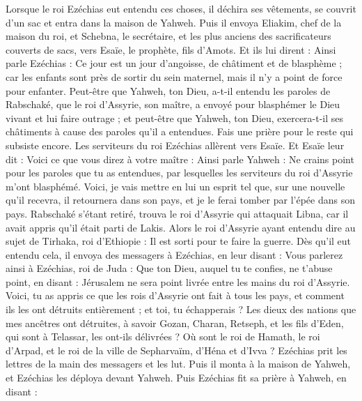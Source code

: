 \begin{multicols}{2}
\VerseOne{}Lorsque le roi Ezéchias eut entendu ces choses, il déchira ses vêtements, se couvrit d'un sac et entra dans la maison de Yahweh.
Puis il envoya Eliakim, chef de la maison du roi, et Schebna, le secrétaire, et les plus anciens des sacrificateurs couverts de sacs, vers Esaïe, le prophète, fils d'Amots.
Et ils lui dirent : Ainsi parle Ezéchias : Ce jour est un jour d'angoisse, de châtiment et de blasphème ; car les enfants sont près de sortir du sein maternel, mais il n'y a point de force pour enfanter.
Peut-être que Yahweh, ton Dieu, a-t-il entendu les paroles de Rabschaké, que le roi d'Assyrie, son maître, a envoyé pour blasphémer le Dieu vivant et lui faire outrage ; et peut-être que Yahweh, ton Dieu, exercera-t-il ses châtiments à cause des paroles qu'il a entendues. Fais une prière pour le reste qui subsiste encore.
Les serviteurs du roi Ezéchias allèrent vers Esaïe.
Et Esaïe leur dit : Voici ce que vous direz à votre maître : Ainsi parle Yahweh : Ne crains point pour les paroles que tu as entendues, par lesquelles les serviteurs du roi d'Assyrie m'ont blasphémé.
Voici, je vais mettre en lui un esprit tel que, sur une nouvelle qu'il recevra, il retournera dans son pays, et je le ferai tomber par l'épée dans son pays.
Rabschaké s'étant retiré, trouva le roi d'Assyrie qui attaquait Libna, car il avait appris qu'il était parti de Lakis.
Alors le roi d'Assyrie ayant entendu dire au sujet de Tirhaka, roi d'Ethiopie : Il est sorti pour te faire la guerre. Dès qu'il eut entendu cela, il envoya des messagers à Ezéchias, en leur disant :
Vous parlerez ainsi à Ezéchias, roi de Juda : Que ton Dieu, auquel tu te confies, ne t'abuse point, en disant : Jérusalem ne sera point livrée entre les mains du roi d'Assyrie.
Voici, tu as appris ce que les rois d'Assyrie ont fait à tous les pays, et comment ils les ont détruits entièrement ; et toi, tu échapperais ?
Les dieux des nations que mes ancêtres ont détruites, à savoir Gozan, Charan, Retseph, et les fils d'Eden, qui sont à Telassar, les ont-ils délivrées ?
Où sont le roi de Hamath, le roi d'Arpad, et le roi de la ville de Sepharvaïm, d'Héna et d'Ivva ?
Ezéchias prit les lettres de la main des messagers et les lut. Puis il monta à la maison de Yahweh, et Ezéchias les déploya devant Yahweh.
Puis Ezéchias fit sa prière à Yahweh, en disant :

\end{multicols}
